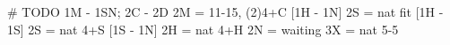 # TODO
1M - 1SN; 2C - 2D
2M = 11-15, (2)4+C
[1H - 1N] 2S = nat fit
[1H - 1S] 2S = nat 4+S
[1S - 1N] 2H = nat 4+H
2N = waiting
3X = nat 5-5